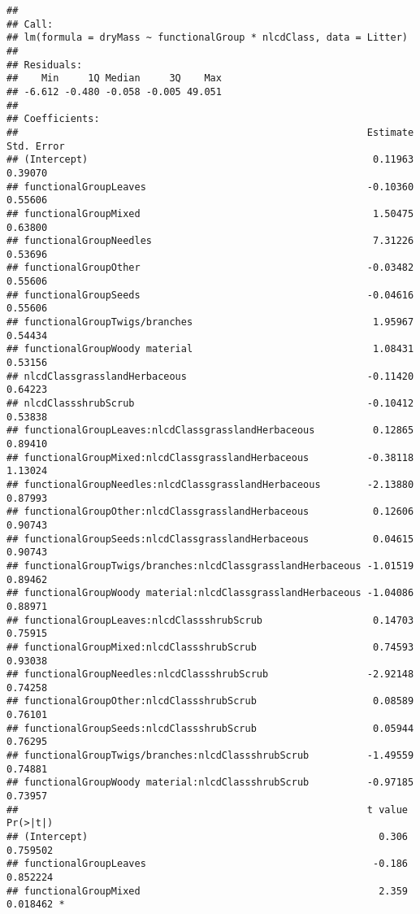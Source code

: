 \documentclass[
]{article}
\begin{document}
\begin{verbatim}
## 
## Call:
## lm(formula = dryMass ~ functionalGroup * nlcdClass, data = Litter)
## 
## Residuals:
##    Min     1Q Median     3Q    Max 
## -6.612 -0.480 -0.058 -0.005 49.051 
## 
## Coefficients:
##                                                            Estimate Std. Error
## (Intercept)                                                 0.11963    0.39070
## functionalGroupLeaves                                      -0.10360    0.55606
## functionalGroupMixed                                        1.50475    0.63800
## functionalGroupNeedles                                      7.31226    0.53696
## functionalGroupOther                                       -0.03482    0.55606
## functionalGroupSeeds                                       -0.04616    0.55606
## functionalGroupTwigs/branches                               1.95967    0.54434
## functionalGroupWoody material                               1.08431    0.53156
## nlcdClassgrasslandHerbaceous                               -0.11420    0.64223
## nlcdClassshrubScrub                                        -0.10412    0.53838
## functionalGroupLeaves:nlcdClassgrasslandHerbaceous          0.12865    0.89410
## functionalGroupMixed:nlcdClassgrasslandHerbaceous          -0.38118    1.13024
## functionalGroupNeedles:nlcdClassgrasslandHerbaceous        -2.13880    0.87993
## functionalGroupOther:nlcdClassgrasslandHerbaceous           0.12606    0.90743
## functionalGroupSeeds:nlcdClassgrasslandHerbaceous           0.04615    0.90743
## functionalGroupTwigs/branches:nlcdClassgrasslandHerbaceous -1.01519    0.89462
## functionalGroupWoody material:nlcdClassgrasslandHerbaceous -1.04086    0.88971
## functionalGroupLeaves:nlcdClassshrubScrub                   0.14703    0.75915
## functionalGroupMixed:nlcdClassshrubScrub                    0.74593    0.93038
## functionalGroupNeedles:nlcdClassshrubScrub                 -2.92148    0.74258
## functionalGroupOther:nlcdClassshrubScrub                    0.08589    0.76101
## functionalGroupSeeds:nlcdClassshrubScrub                    0.05944    0.76295
## functionalGroupTwigs/branches:nlcdClassshrubScrub          -1.49559    0.74881
## functionalGroupWoody material:nlcdClassshrubScrub          -0.97185    0.73957
##                                                            t value Pr(>|t|)    
## (Intercept)                                                  0.306 0.759502    
## functionalGroupLeaves                                       -0.186 0.852224    
## functionalGroupMixed                                         2.359 0.018462 *  

\end{verbatim}
\end{document}
